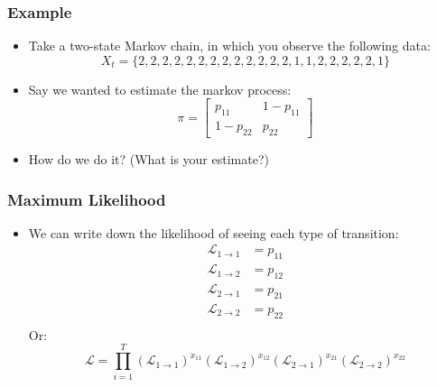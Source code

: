 \documentclass{beamer}
\author{Trevor Gallen}
\date{}
\begin{document}
\renewcommand*{\inserttotalframenumber}{\pageref{lastframe}}

\begin{frame}
\titlepage
\end{frame}


\begin{frame}
\frametitle[alignment=center]{Example}
\begin{itemize}
\item Take a two-state Markov chain, in which you observe the following data:
$$X_t=\{2,2,2,2,2,2,2,2,2,2,2,2,2,1,1,2,2,2,2,2,1\}$$
\bigskip
\item Say we wanted to estimate the markov process:
$$\pi=\left[\begin{array}{cc}p_{11} & 1-p_{11} \\ 1-p_{22} & p_{22}\end{array}\right]$$
\item How do we do it? (What is your estimate?)
\end{itemize}
\end{frame}

\begin{frame}
\frametitle[alignment=center]{Maximum Likelihood}
\begin{itemize}
\item We can write down the likelihood of seeing each type of transition:
\begin{align*}
\mathcal{L}_{1\rightarrow 1} & =p_{11}\\
\mathcal{L}_{1\rightarrow 2} & =p_{12}\\
\mathcal{L}_{2\rightarrow 1} & =p_{21}\\
\mathcal{L}_{2\rightarrow 2} & =p_{22}\\
\end{align*}
Or:
$$\mathcal{L}=\prod_{i=1}^T (\mathcal{L}_{1\rightarrow 1})^{x_{11}}(\mathcal{L}_{1\rightarrow 2})^{x_{12}}(\mathcal{L}_{2\rightarrow 1})^{x_{21}}(\mathcal{L}_{2\rightarrow 2})^{x_{22}}$$
\end{itemize}
\end{frame}
\end{document}
